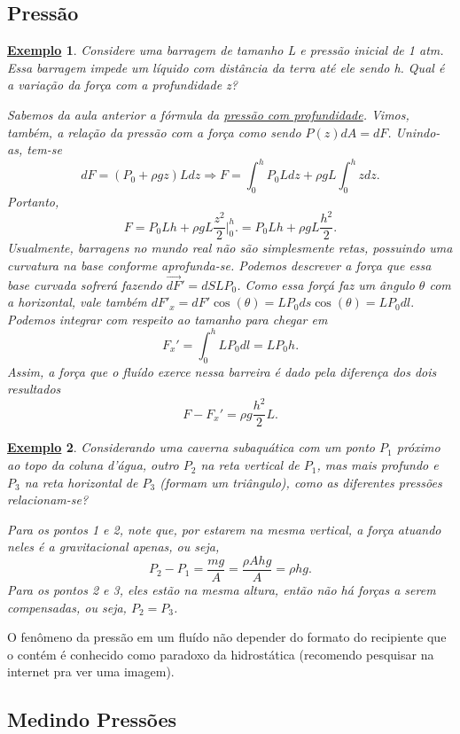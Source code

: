 \documentclass{article}
\newtheorem{example}{\underline{Exemplo}}
\begin{document}
\subsection{Pressão}
\begin{example}
  Considere uma barragem de tamanho L e pressão inicial de 1 atm. Essa barragem impede um líquido com distância da terra até ele sendo h.
Qual é a variação da força com a profundidade z?

  Sabemos da aula anterior a fórmula da \textit{\hyperlink{pressure_submerging}{pressão com profundidade}}. Vimos, também, a relação da pressão com a força
como sendo \(P(z)dA = dF\). Unindo-as, tem-se 
  \[
    dF = (P_{0}+\rho gz)Ldz \Rightarrow F = \int_{0}^{h}P_{0}Ldz + \rho gL \int_{0}^{h}z dz.
  \]
  Portanto, 
    \[
      F = P_{0}Lh + \rho gL \frac{z^{2}}{2}\biggl|_{0}^{h}\biggr. = P_{0}Lh + \rho gL \frac{h^{2}}{2}.
    \]
  Usualmente, barragens no mundo real não são simplesmente retas, possuindo uma curvatura na base conforme aprofunda-se. Podemos descrever 
a força que essa base curvada sofrerá fazendo \(\vec{dF}' = dS L P_{0}\). Como essa forçá faz um ângulo \(\theta \) com a horizontal, vale também
\(dF'_{x} = dF'\cos{(\theta )} = LP_{0}ds\cos{(\theta )} = LP_{0}dl.\) Podemos integrar com respeito ao tamanho para chegar em 
   \[
     F_{x}' = \int_{0}^{h}LP_{0}dl = LP_{0}h.
   \]
 Assim, a força que o fluído exerce nessa barreira é dado pela diferença dos dois resultados 
   \[
     F - F_{x}' = \rho g \frac{h^{2}}{2}L.
   \]
\end{example}
\begin{example}
  Considerando uma caverna subaquática com um ponto \(P_{1}\) próximo ao topo da coluna d'água,
outro \(P_{2}\) na reta vertical de \(P_{1}\), mas mais profundo e \(P_{3}\) na reta horizontal de \(P_{3}\) 
(formam um triângulo), como as diferentes pressões relacionam-se?

  Para os pontos 1 e 2, note que, por estarem na mesma vertical, a força atuando neles é a gravitacional apenas, ou seja, 
    \[
      P_{2} - P_{1} = \frac{mg}{A} = \frac{\rho Ahg}{A} = \rho hg.
    \]
  Para os pontos 2 e 3, eles estão na mesma altura, então não há forças a serem compensadas, ou seja, \(P_{2} = P_{3}\).
\end{example}
  O fenômeno da pressão em um fluído não depender do formato do recipiente que o contém é conhecido como paradoxo da hidrostática (recomendo pesquisar na internet pra ver uma imagem).

\subsection{Medindo Pressões}
\end{document}
